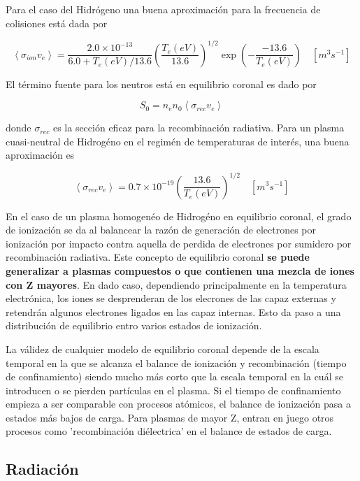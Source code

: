 \documentclass[11pt]{article}
\theoremstyle{definition}
\begin{document}
  Para el caso del Hidr\'ogeno una buena aproximaci\'on para la frecuencia de colisiones est\'a dada por 

  \begin{equation}
    \left<\sigma_{ion}v_e\right> = \frac{2.0\times 10^{-13}}{6.0 + T_e(eV)/ 13.6}\left(\frac{T_e(eV)}{13.6}\right)^{1/2}\exp{\left(-\frac{-13.6}{T_e(eV)}\right)} \quad [m^{3}s^{-1}]
  \end{equation}

  El t\'ermino fuente para los neutros est\'a en equilibrio coronal es dado por 

  \begin{equation}
    S_0 = n_en_0\left<\sigma_{rec}v_e\right>
  \end{equation}

  donde $\sigma_{rec}$ es la secci\'on eficaz para la recombinaci\'on radiativa. Para un plasma cuasi-neutral de Hidrog\'eno en el regim\'en de temperaturas de inter\'es, una buena aproximaci\'on es 

  \begin{equation}
    \left<\sigma_{rec}v_e\right> = 0.7\times10^{-19}\left(\frac{13.6}{T_e(eV)}\right)^{1/2} \quad [m^3s^{-1}]
  \end{equation}

  En el caso de un plasma homogen\'eo de Hidrog\'eno en equilibrio coronal, el grado de ionizaci\'on se da al balancear la raz\'on de generaci\'on de electrones por ionizaci\'on por impacto contra aquella de perdida de electrones por sumidero por recombinaci\'on radiativa. Este concepto de equilibrio coronal \textbf{se puede generalizar a plasmas compuestos o que contienen una mezcla de iones con Z mayores}. En dado caso, dependiendo principalmente en la temperatura electr\'onica, los iones se desprenderan de los elecrones de las capaz externas y retendr\'an algunos electrones ligados en las capaz internas. Esto da paso a una distribuci\'on de equilibrio entro varios estados de ionizaci\'on. 

  La v\'alidez de cualquier modelo de equilibrio coronal depende de la escala temporal en la que se alcanza el balance de ionizaci\'on y recombinaci\'on (tiempo de confinamiento) siendo mucho m\'as corto que la escala temporal  en la cu\'al se introducen o se pierden part\'iculas en el plasma. Si el tiempo de confinamiento empieza a ser comparable con procesos at\'omicos, el balance de ionizaci\'on pasa a estados m\'as bajos de carga. Para plasmas de mayor Z, entran en juego otros procesos como 'recombinaci\'on di\'electrica' en el balance de estados de carga.  

  \subsection{Radiaci\'on}
  
  




  
  
\end{document}
